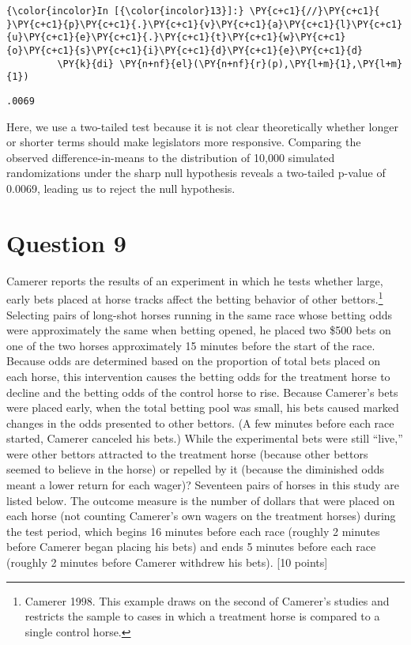 \documentclass[11pt,notitlepage]{article}\usepackage[]{graphicx}\usepackage[]{color}
\makeatletter
\newenvironment{kframe}{%
 \def\at@end@of@kframe{}%
 \ifinner\ifhmode%
  \def\at@end@of@kframe{\end{minipage}}%
  \begin{minipage}{\columnwidth}%
 \fi\fi%
 \def\FrameCommand##1{\hskip\@totalleftmargin \hskip-\fboxsep
 \colorbox{shadecolor}{##1}\hskip-\fboxsep
     \hskip-\linewidth \hskip-\@totalleftmargin \hskip\columnwidth}%
 \MakeFramed {\advance\hsize-\width
   \@totalleftmargin\z@ \linewidth\hsize
   \@setminipage}}%
 {\par\unskip\endMakeFramed%
 \at@end@of@kframe}
\newenvironment{knitrout}{}{} %
\makeatother
\begin{document}
\begin{enumerate}[a)]
\begin{knitrout}
\begin{kframe}
    \begin{Verbatim}[commandchars=\\\{\}]
{\color{incolor}In [{\color{incolor}13}]:} \PY{c+c1}{//}\PY{c+c1}{ }\PY{c+c1}{p}\PY{c+c1}{.}\PY{c+c1}{v}\PY{c+c1}{a}\PY{c+c1}{l}\PY{c+c1}{u}\PY{c+c1}{e}\PY{c+c1}{.}\PY{c+c1}{t}\PY{c+c1}{w}\PY{c+c1}{o}\PY{c+c1}{s}\PY{c+c1}{i}\PY{c+c1}{d}\PY{c+c1}{e}\PY{c+c1}{d}
         \PY{k}{di} \PY{n+nf}{el}(\PY{n+nf}{r}(p),\PY{l+m}{1},\PY{l+m}{1})
\end{Verbatim}

    \begin{Verbatim}[commandchars=\\\{\}]
.0069

    \end{Verbatim}
\end{kframe}
\end{knitrout}

Here, we use a two-tailed test because it is not clear theoretically whether longer or shorter terms should make legislators more responsive. Comparing the observed difference-in-means to the distribution of 10,000 simulated randomizations under the sharp null hypothesis reveals a two-tailed p-value of 0.0069, leading us to reject the null hypothesis. 
\end{enumerate}

\section*{Question 9}

Camerer reports the results of an experiment in which he tests whether large, early bets placed at horse tracks affect the betting behavior of other bettors.\footnote{Camerer 1998.  This example draws on the second of Camerer's studies and restricts the sample to cases in which a treatment horse is compared to a single control horse.} Selecting pairs of long-shot horses running in the same race whose betting odds were approximately the same when betting opened, he placed two \$500 bets on one of the two horses approximately 15 minutes before the start of the race. Because odds are determined based on the proportion of total bets placed on each horse, this intervention causes the betting odds for the treatment horse to decline and the betting odds of the control horse to rise. Because Camerer's bets were placed early, when the total betting pool was small, his bets caused marked changes in the odds presented to other bettors. (A few minutes before each race started, Camerer canceled his bets.) While the experimental bets were still ``live,'' were other bettors attracted to the treatment horse (because other bettors seemed to believe in the horse) or repelled by it (because the diminished odds meant a lower return for each wager)? Seventeen pairs of horses in this study are listed below. The outcome measure is the number of dollars that were placed on each horse (not counting Camerer's own wagers on the treatment horses) during the test period, which begins 16 minutes before each race (roughly 2 minutes before Camerer began placing his bets) and ends 5 minutes before each race (roughly 2 minutes before Camerer withdrew his bets). [10 points]
\end{document}
